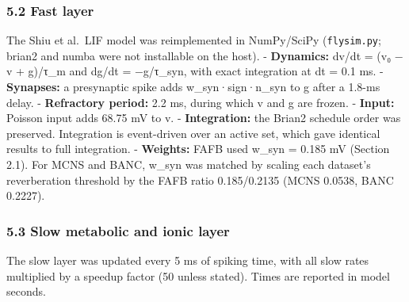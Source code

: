 \documentclass[11pt]{article}
\begin{document}
\subsubsection{5.2 Fast layer}\label{fast-layer}

The Shiu et al.~LIF model \cite{shiu2024} was reimplemented in NumPy/SciPy (\texttt{flysim.py}; brian2 and numba were not installable on the host).
- \textbf{Dynamics:} dv/dt = (v₀ − v + g)/τ\_m and dg/dt = −g/τ\_syn, with exact integration at dt = 0.1 ms.
- \textbf{Synapses:} a presynaptic spike adds w\_syn·sign·n\_syn to g after a 1.8-ms delay.
- \textbf{Refractory period:} 2.2 ms, during which v and g are frozen.
- \textbf{Input:} Poisson input adds 68.75 mV to v.
- \textbf{Integration:} the Brian2 schedule order was preserved. Integration is event-driven over an active set, which gave identical results to full integration.
- \textbf{Weights:} FAFB used w\_syn = 0.185 mV (Section 2.1). For MCNS and BANC, w\_syn was matched by scaling each dataset's reverberation threshold by the FAFB ratio 0.185/0.2135 (MCNS 0.0538, BANC 0.2227).

\subsubsection{5.3 Slow metabolic and ionic layer}\label{slow-metabolic-and-ionic-layer}

The slow layer was updated every 5 ms of spiking time, with all slow rates multiplied by a speedup factor (50 unless stated). Times are reported in model seconds.
\end{document}
